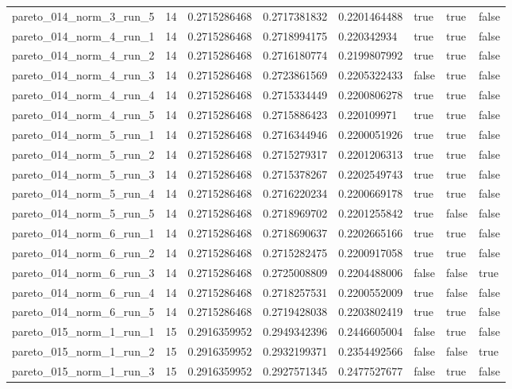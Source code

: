 \begin{tabular}{@{}llllllll@{}}
pareto\_014\_norm\_3\_run\_5 & 14 & 0.2715286468 & 0.2717381832 & 0.2201464488 & true & true & false \\
pareto\_014\_norm\_4\_run\_1 & 14 & 0.2715286468 & 0.2718994175 & 0.220342934 & true & true & false \\
pareto\_014\_norm\_4\_run\_2 & 14 & 0.2715286468 & 0.2716180774 & 0.2199807992 & true & true & false \\
pareto\_014\_norm\_4\_run\_3 & 14 & 0.2715286468 & 0.2723861569 & 0.2205322433 & false & true & false \\
pareto\_014\_norm\_4\_run\_4 & 14 & 0.2715286468 & 0.2715334449 & 0.2200806278 & true & true & false \\
pareto\_014\_norm\_4\_run\_5 & 14 & 0.2715286468 & 0.2715886423 & 0.220109971 & true & true & false \\
pareto\_014\_norm\_5\_run\_1 & 14 & 0.2715286468 & 0.2716344946 & 0.2200051926 & true & true & false \\
pareto\_014\_norm\_5\_run\_2 & 14 & 0.2715286468 & 0.2715279317 & 0.2201206313 & true & true & false \\
pareto\_014\_norm\_5\_run\_3 & 14 & 0.2715286468 & 0.2715378267 & 0.2202549743 & true & true & false \\
pareto\_014\_norm\_5\_run\_4 & 14 & 0.2715286468 & 0.2716220234 & 0.2200669178 & true & true & false \\
pareto\_014\_norm\_5\_run\_5 & 14 & 0.2715286468 & 0.2718969702 & 0.2201255842 & true & false & false \\
pareto\_014\_norm\_6\_run\_1 & 14 & 0.2715286468 & 0.2718690637 & 0.2202665166 & true & true & false \\
pareto\_014\_norm\_6\_run\_2 & 14 & 0.2715286468 & 0.2715282475 & 0.2200917058 & true & true & false \\
pareto\_014\_norm\_6\_run\_3 & 14 & 0.2715286468 & 0.2725008809 & 0.2204488006 & false & false & true \\
pareto\_014\_norm\_6\_run\_4 & 14 & 0.2715286468 & 0.2718257531 & 0.2200552009 & true & false & false \\
pareto\_014\_norm\_6\_run\_5 & 14 & 0.2715286468 & 0.2719428038 & 0.2203802419 & true & true & false \\
pareto\_015\_norm\_1\_run\_1 & 15 & 0.2916359952 & 0.2949342396 & 0.2446605004 & false & true & false \\
pareto\_015\_norm\_1\_run\_2 & 15 & 0.2916359952 & 0.2932199371 & 0.2354492566 & false & false & true \\
pareto\_015\_norm\_1\_run\_3 & 15 & 0.2916359952 & 0.2927571345 & 0.2477527677 & false & true & false \\

\end{tabular}
